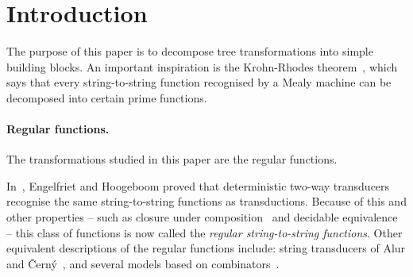 
\section{Introduction}

The purpose of this paper is to decompose tree transformations into simple building blocks. An important inspiration  is the Krohn-Rhodes theorem~\cite[p.~454]{Krohn1965}, which says that every string-to-string function recognised by a Mealy machine can be decomposed into certain prime functions. 

\paragraph*{Regular functions.} The transformations studied in this paper are the  regular functions.

In~\cite[Theorem 13]{engelfrietMSODefinableString2001}, Engelfriet and Hoogeboom proved that deterministic two-way transducers recognise the same string-to-string functions as \mso transductions. Because of this and other properties -- such as closure under composition~\cite[Theorem 1]{chytilSerialComposition2Way1977} and decidable equivalence~\cite[Theorem 1]{gurariEquivalenceProblemDeterministic1982} --  this class of functions is now called the \emph{regular string-to-string functions}. Other  equivalent descriptions of the regular functions include: string transducers of Alur and {\v C}ern{\'y}~\cite{alurExpressivenessStreamingString2010}, and several models based on combinators~\cite{alur2014regular,daveGastinKrishna18, bojanczykRegularFirstOrderList2018}. 
 

